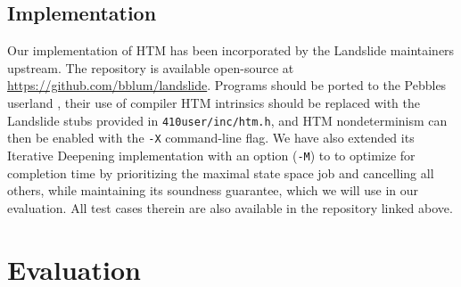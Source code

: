\documentclass[10pt]{sigplanconf}
\begin{document}
\subsection{Implementation}

Our implementation of HTM has been incorporated by the Landslide maintainers upstream.
The repository is available open-source at \url{https://github.com/bblum/landslide}.
Programs should be ported to the Pebbles userland \cite{thrlib,kspec},
their use of compiler HTM intrinsics should be replaced with the Landslide stubs provided in {\tt 410user/inc/htm.h},
and HTM nondeterminism can then be enabled with the {\tt -X} command-line flag.
We have also extended its Iterative Deepening implementation \cite{quicksand}
with an option ({\tt -M}) to
to optimize for completion time by prioritizing the maximal state space job and cancelling all others,
while maintaining its soundness guarantee,
which we will use in our evaluation.
All test cases therein are also available in the repository linked above.


\section{Evaluation}
\end{document}
